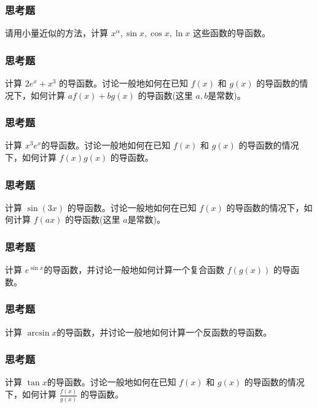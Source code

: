 \documentclass[CJK,13pt]{beamer}
\begin{document}
\begin{frame}
  \frametitle{思考题}

  
  请用小量近似的方法，计算 $x^\alpha, \sin x, \cos x, \ln x$ 这些函数的导函数。
\end{frame}


\begin{frame}
  \frametitle{思考题}

  
  计算 $2e^x+x^3$ 的导函数。讨论一般地如何在已知 $f(x)$ 和 $g(x)$ 的导函数的情况下，如何计算 $af(x)+bg(x)$ 的导函数(这里 $a, b$是常数)。
\end{frame}




\begin{frame}
  \frametitle{思考题}

  
  计算 $x^3e^x$的导函数。讨论一般地如何在已知 $f(x)$ 和 $g(x)$ 的导函数的情况下，如何计算 $f(x)g(x)$ 的导函数。
\end{frame}


\begin{frame}
  \frametitle{思考题}

  
  计算 $\sin(3x)$ 的导函数。讨论一般地如何在已知 $f(x)$ 的导函数的情况下，如何计算 $f(ax)$ 的导函数(这里 $a$是常数)。
\end{frame}



\begin{frame}
  \frametitle{思考题}

  
  计算 $e^{\sin x}$的导函数，并讨论一般地如何计算一个复合函数 $f(g(x))$ 的导函数。
\end{frame}


\begin{frame}
  \frametitle{思考题}

  
  计算 $\arcsin x$的导函数，并讨论一般地如何计算一个反函数的导函数。
\end{frame}


\begin{frame}
  \frametitle{思考题}

  
  计算 $\tan x$的导函数。讨论一般地如何在已知 $f(x)$ 和 $g(x)$ 的导函数的情况下，如何计算 $\frac{f(x)}{g(x)}$ 的导函数。
\end{frame}
\end{document}
